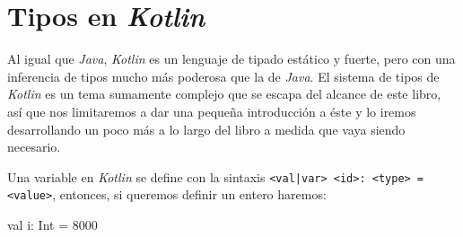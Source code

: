 \section{Tipos en \textit{Kotlin}}
  Al igual que \textit{Java}, \textit{Kotlin} es un lenguaje de tipado estático y fuerte, pero con 
  una inferencia de tipos mucho más poderosa que la de \textit{Java}.
  El sistema de tipos de \textit{Kotlin} es un tema sumamente complejo que se escapa del alcance de 
  este libro, así que nos limitaremos a dar una pequeña introducción a éste y lo iremos
  desarrollando un poco más a lo largo del libro a medida que vaya siendo necesario.

  Una variable en \textit{Kotlin} se define con la sintaxis \texttt{<val|var> <id>: <type> = 
  <value>}, entonces, si queremos definir un entero haremos:

  \begin{kotlin}
    val i: Int = 8000
  \end{kotlin}

  
